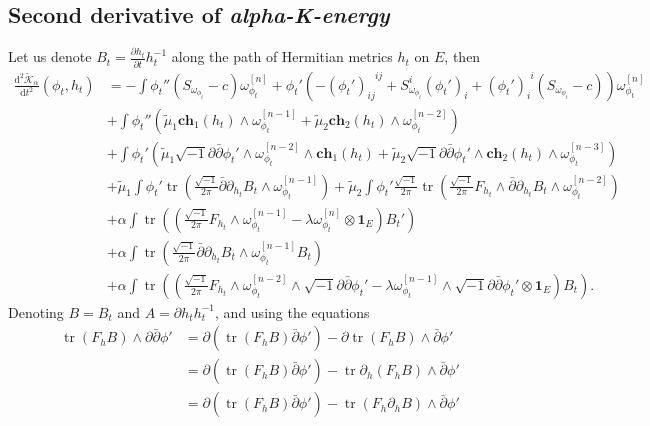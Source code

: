 \documentclass[10pt, letterpaper]{amsart}
\newcommand{\tr}{\operatorname{tr}}
\theoremstyle{plain}
\theoremstyle{definition}
\numberwithin{equation}{section}
\begin{document}
\subsection{Second derivative of \emph{alpha-K-energy}}
Let us denote $B_t=\frac{\partial h_t}{\partial t}h_t^{-1}$ along the path of Hermitian metrics $h_t$ on $E$, then
\begin{equation}
\label{eqn:raw-second}
\begin{split}
\frac{\mathrm{d}^2\widetilde{\mathcal{K}}_\alpha}{\mathrm{d}t^2}\left( \phi_t,h_t\right)
& = 
- \int \phi_t'' \left(S_{\omega_{\phi_t}}-c\right)\omega_{\phi_t}^{[n]} 
+ \phi_t'\left( - \left(\phi_t'\right)_{ij}^{\phantom{ij}ij}+S_{\omega_{\phi_t}}^i\left(\phi_t'\right)_i + \left(\phi_t'\right)_i^{\phantom{i}i}\left(S_{\omega_{\phi_t}}-c\right)\right)\omega_{\phi_t}^{[n]}\\
& + 
\int\phi_t'' \left( \widetilde\mu_1 \mathbf{ch}_1\left(h_t\right)\wedge \omega_{\phi_t}^{[n-1]} + \widetilde\mu_2 \mathbf{ch}_2\left(h_t\right)\wedge \omega_{\phi_t}^{[n-2]}\right)\\
& + 
\int\phi_t'\left( \widetilde\mu_1\sqrt{-1}\partial\bar\partial \phi_t'\wedge \omega_{\phi_t}^{[n-2]}\wedge \mathbf{ch}_1\left(h_t\right) 
+ 
\widetilde\mu_2 \sqrt{-1}\partial\bar\partial \phi_t'\wedge \mathbf{ch}_2\left(h_t\right)\wedge \omega_{\phi_t}^{[n-3]}\right)\\
& + 
\widetilde\mu_1\int \phi_t' \tr \left( \frac{\sqrt{-1}}{2\pi}\bar\partial \partial_{h_t} B_t\wedge\omega_{\phi_t}^{[n-1]}\right)
+ 
\widetilde\mu_2\int \phi_t' \frac{\sqrt{-1}}{2\pi} \tr \left( \frac{\sqrt{-1}}{2\pi}F_{h_t}\wedge \bar\partial \partial_{h_t}B_t\wedge \omega_{\phi_t}^{[n-2]}\right)\\
& + \alpha\int \tr \left( \left( \frac{\sqrt{-1}}{2\pi}F_{h_t}\wedge \omega_{\phi_t}^{[n-1]}
-\lambda \omega_{\phi_t}^{[n]}\otimes \mathbf{1}_E\right) B_t'\right)\\
& + 
\alpha \int \tr \left( \frac{\sqrt{-1}}{2\pi}\bar\partial \partial_{h_t} B_t \wedge \omega_{\phi_t}^{[n-1]}B_t\right)\\
& + 
\alpha\int \tr \left( \left( \frac{\sqrt{-1}}{2\pi}F_{h_t}\wedge \omega_{\phi_t}^{[n-2]}\wedge\sqrt{-1}\partial\bar\partial \phi_t' 
- 
\lambda \omega_{\phi_t}^{[n-1]}\wedge \sqrt{-1}\partial\bar\partial \phi_t'\otimes \mathbf{1}_E \right)B_t\right). 
\end{split}
\end{equation}
Denoting $B=B_t$ and $A=\partial h_t h_t^{-1}$, and using the equations 
\begin{align*}
     \tr \left(F_h B\right)\wedge \partial\bar\partial \phi'
     & = 
     \partial \left( \tr \left(F_h B\right)\bar\partial \phi'\right)
     -
    \partial \tr\left(F_hB\right) \wedge\bar\partial \phi'\\
    & = 
    \partial \left( \tr \left(F_h B\right)\bar\partial \phi'\right)
    -\tr\partial_h\left(F_hB\right)\wedge\bar\partial\phi'\\
    & = 
    \partial \left( \tr \left(F_hB\right)\bar\partial \phi'\right)
    -
    \tr\left(F_h \partial_h B\right)\wedge\bar\partial \phi'
\end{align*}
\end{document}
